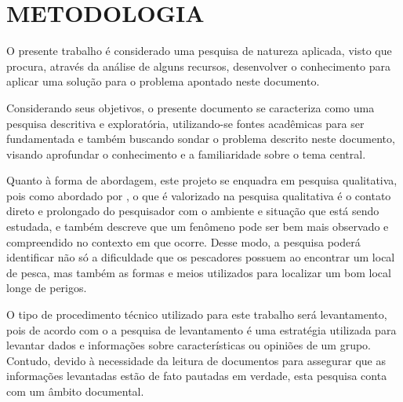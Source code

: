 
\chapter{METODOLOGIA}
\label{chap:metodologia}

O presente trabalho é considerado uma pesquisa de natureza aplicada, visto que procura, através da análise de alguns recursos, desenvolver o conhecimento para aplicar uma solução para o problema apontado neste documento.

Considerando seus objetivos, o presente documento se caracteriza como uma pesquisa descritiva e exploratória, utilizando-se fontes acadêmicas para ser fundamentada e também buscando sondar o problema descrito neste documento, visando aprofundar o conhecimento e a familiaridade sobre o tema central.

Quanto à forma de abordagem, este projeto se enquadra em pesquisa qualitativa, pois como abordado por \textcite{godoy1995introduccao}, o que é valorizado na pesquisa qualitativa é o contato direto e prolongado do pesquisador com o ambiente e situação que está sendo estudada, e também descreve que um fenômeno pode ser bem mais observado e compreendido no contexto em que ocorre. Desse modo, a pesquisa poderá identificar não só a dificuldade que os pescadores possuem ao encontrar um local de pesca, mas também as formas e meios utilizados para localizar um bom local longe de perigos.

O tipo de procedimento técnico utilizado para este trabalho será levantamento, pois de acordo com o \textcite{de2023metodologia} a pesquisa de levantamento é uma estratégia utilizada para levantar dados e informações sobre características ou opiniões de um grupo. Contudo, devido à necessidade da leitura de documentos para assegurar que as informações levantadas estão de fato pautadas em verdade, esta pesquisa conta com um âmbito documental.
